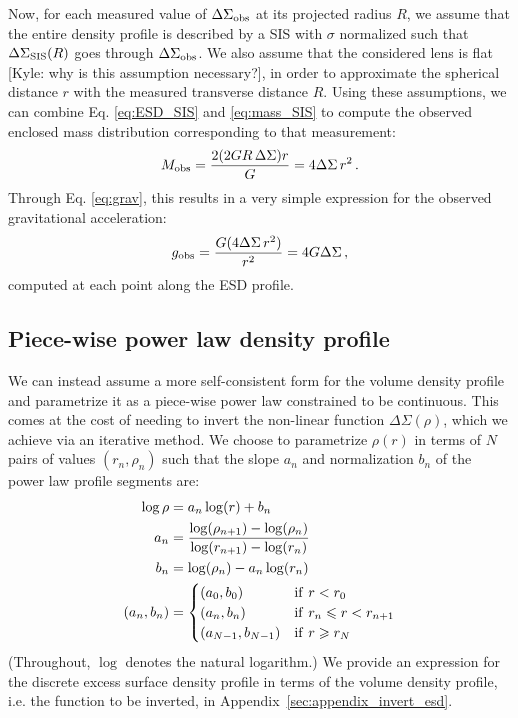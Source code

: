 \documentclass[usenatbib]{mnras}
\newcommand{\un}[1]{_{\rm #1}}
\begin{document}
Now, for each measured value of $\Delta\Sigma\un{obs}$ at its projected radius $R$, we assume that the entire density profile is described by a SIS with $\sigma$ normalized such that $\Delta\Sigma\un{SIS}(R)$ goes through $\Delta\Sigma\un{obs}$. We also assume that the considered lens is flat [Kyle: why is this assumption necessary?], in order to approximate the spherical distance $r$ with the measured transverse distance $R$. Using these assumptions, we can combine Eq. \ref{eq:ESD_SIS} and \ref{eq:mass_SIS} to compute the observed enclosed mass distribution corresponding to that measurement:
\begin{equation}
	M\un{obs} = \frac{2 (2 G R \, \Delta\Sigma) r}{G} = 4 \Delta\Sigma \, r^2 \, .
\end{equation}
Through Eq. \ref{eq:grav}, this results in a very simple expression for the observed gravitational acceleration:
\begin{equation}
g\un{obs} = \frac{G (4 \Delta\Sigma \, r^2)}{r^2} = 4 G \Delta\Sigma \, ,
\end{equation}
computed at each point along the ESD profile.


\subsection{Piece-wise power law density profile}
\label{sec:piece-wise_powerlaw}

We can instead assume a more self-consistent form for the volume density profile and parametrize it as a piece-wise power law constrained to be continuous. This comes at the cost of needing to invert the non-linear function $\Delta\Sigma(\rho)$, which we achieve via an iterative method. We choose to parametrize $\rho(r)$ in terms of $N$ pairs of values $(r_n,\rho_n)$ such that the slope $a_n$ and normalization $b_n$ of the power law profile segments are:
\begin{align}
\log\rho &= a_n \log(r) + b_n \\
a_n &= \frac{\log(\rho_{n+1})-\log(\rho_n)}{\log(r_{n+1})-\log(r_n)}\\
b_n &= \log(\rho_n) - a_n\log(r_n)\\
(a_n, b_n) &=
\begin{cases}
(a_0, b_0) & {\rm if}\ r < r_0\\
(a_n, b_n) & {\rm if}\ r_n \leq r < r_{n+1}\\
(a_{N-1}, b_{N-1}) & {\rm if}\ r \geq r_N
\end{cases}
\label{eq:rho_piecewise_powerlaw}\end{align}
(Throughout, $\log$ denotes the natural logarithm.) We provide an expression for the discrete excess surface density profile in terms of the volume density profile, i.e. the function to be inverted, in Appendix~\ref{sec:appendix_invert_esd}.
\end{document}
